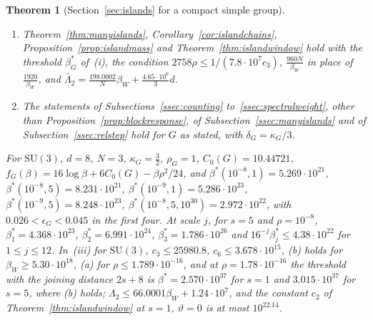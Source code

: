 \documentclass[11pt]{amsart}
\newtheorem{theorem}{Theorem}[section]
\theoremstyle{definition}
\theoremstyle{remark}
\numberwithin{equation}{section}
\newcommand{\SU}{\mathrm{SU}}
\begin{document}
\begin{theorem}[Section~\ref{sec:islands} for a compact simple group]
\begin{enumerate}[label=\textup{(\roman*)},leftmargin=*]
\begin{gather*}
a_G=1558.56\,\sqrt N\,\tfrac d3\sqrt{\kappa_G}+1.1986,\\
b_G=779.28\,\sqrt N\,\tfrac d3\sqrt{\kappa_G}+0.5993 .
\end{gather*}
\item Theorem~\ref{thm:manyislands}, Corollary~\ref{cor:islandchains},
Proposition~\ref{prop:islandmass} and Theorem~\ref{thm:islandwindow} hold
with the threshold $\beta^*_G$ of~(i), the condition $2758\rho\le1/(7.8
\cdot10^7c_3)$, $\frac{960N}{\beta_W}$ in place of $\frac{1920}{\beta_W}$,
and $\bar\Lambda_2=\frac{198.0002}N\beta_W+\frac{4.65\cdot10^6}3d$.
\item The statements of Subsections~\ref{ssec:counting}
to~\ref{ssec:spectralweight}, other than
Proposition~\ref{prop:blockresponse}, of
Subsection~\ref{ssec:manyislands} and of Subsection~\ref{ssec:relstep}
hold for $G$ as stated, with $\delta_G=\kappa_G/3$.
\end{enumerate}
For $\SU(3)$, $d=8$, $N=3$, $\kappa_G=\frac32$, $\rho_G=1$, $C_0(G)=
10.44721$, $f_G(\beta)=16\log\beta+6C_0(G)-\beta\rho^2/24$, and
$\beta^*(10^{-8},1)=5.269\cdot10^{21}$, $\beta^*(10^{-8},5)=8.231\cdot
10^{21}$, $\beta^*(10^{-9},1)=5.286\cdot10^{23}$, $\beta^*(10^{-9},5)=
8.248\cdot10^{23}$, $\beta^*(10^{-8},5,10^{30})=2.972\cdot10^{22}$, with
$0.026<\epsilon_G<0.045$ in the first four. At scale $j$, for $s=5$ and
$\rho=10^{-8}$, $\beta^*_1=4.368\cdot10^{23}$, $\beta^*_2=6.991\cdot
10^{24}$, $\beta^*_3=1.786\cdot10^{26}$ and $16^{-j}\beta^*_j\le4.38\cdot
10^{22}$ for $1\le j\le12$. In~(iii) for $\SU(3)$, $c_3\le25980.8$,
$c_6\le3.678\cdot10^{15}$, (b) holds for $\beta_W\ge5.30\cdot10^{18}$,
(a) for $\rho\le1.789\cdot10^{-16}$, and at $\rho=1.78\cdot10^{-16}$ the
threshold with the joining distance $2s+8$ is $\beta^*=2.570\cdot10^{37}$
for $s=1$ and $3.015\cdot10^{37}$ for $s=5$, where (b) holds;
$\Lambda_2\le66.0001\beta_W+1.24\cdot10^7$, and the constant $c_2$ of
Theorem~\ref{thm:islandwindow} at $s=1$, $\vartheta=0$ is at most
$10^{22.14}$.
\end{theorem}
\end{document}
